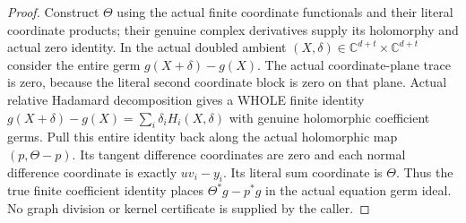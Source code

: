 \begin{proof}
Construct $\Theta$ using the actual finite coordinate functionals and their
literal coordinate products; their genuine complex derivatives supply its
holomorphy and actual zero identity. In the actual doubled ambient
$(X,\delta)\in\mathbb C^{d+t}\times\mathbb C^{d+t}$ consider the entire
germ $g(X+\delta)-g(X)$. The actual coordinate-plane trace is zero, because
the literal second coordinate block is zero on that plane. Actual relative
Hadamard decomposition gives a WHOLE finite identity
$g(X+\delta)-g(X)=\sum_i\delta_i H_i(X,\delta)$ with genuine holomorphic
coefficient germs. Pull this entire identity back along the actual
holomorphic map $(p,\Theta-p)$. Its tangent difference coordinates are zero
and each normal difference coordinate is exactly $uv_i-y_i$. Its literal
sum coordinate is $\Theta$. Thus the true finite coefficient identity
places $\Theta^*g-p^*g$ in the actual equation germ ideal. No graph division
or kernel certificate is supplied by the caller.
\end{proof}

